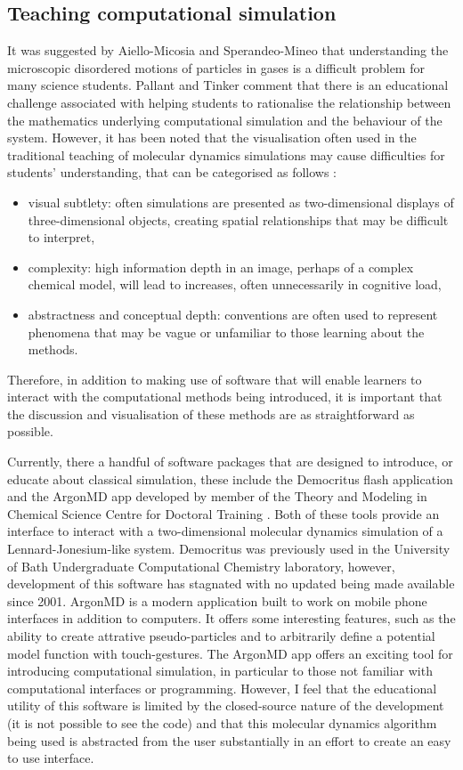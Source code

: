 \subsection{Teaching computational simulation}
It was suggested by Aiello-Micosia and Sperandeo-Mineo \cite{aiello-nicosia_computer_1985} that understanding the microscopic disordered motions of particles in gases is a difficult problem for many science students.
Pallant and Tinker \cite{pallant_reasoning_2004} comment that there is an educational challenge associated with helping students to rationalise the relationship between the mathematics underlying computational simulation and the behaviour of the system.
However, it has been noted that the visualisation often used in the traditional teaching of molecular dynamics simulations may cause difficulties for students' understanding, that can be categorised as follows \cite{jones_molecular_2005}:
\begin{itemize}
\item visual subtlety: often simulations are presented as two-dimensional displays of three-dimensional objects, creating spatial relationships that may be difficult to interpret,
\item complexity: high information depth in an image, perhaps of a complex chemical model, will lead to increases, often unnecessarily in cognitive load,
\item abstractness and conceptual depth: conventions are often used to represent phenomena that may be vague or unfamiliar to those learning about the methods.
\end{itemize}
Therefore, in addition to making use of software that will enable learners to interact with the computational methods being introduced, it is important that the discussion and visualisation of these methods are as straightforward as possible.

Currently, there a handful of software packages that are designed to introduce, or educate about classical simulation, these include the Democritus flash application and the ArgonMD app developed by member of the Theory and Modeling in Chemical Science Centre for Doctoral Training \cite{noauthor_democritus_nodate,noauthor_argonmd_nodate}.
Both of these tools provide an interface to interact with a two-dimensional molecular dynamics simulation of a Lennard-Jonesium-like system.
Democritus was previously used in the University of Bath Undergraduate Computational Chemistry laboratory, however, development of this software has stagnated with no updated being made available since 2001.
ArgonMD is a modern application built to work on mobile phone interfaces in addition to computers.
It offers some interesting features, such as the ability to create attrative pseudo-particles and to arbitrarily define a potential model function with touch-gestures.
The ArgonMD app offers an exciting tool for introducing computational simulation, in particular to those not familiar with computational interfaces or programming.
However, I feel that the educational utility of this software is limited by the closed-source nature of the development (it is not possible to see the code) and that this molecular dynamics algorithm being used is abstracted from the user substantially in an effort to create an easy to use interface.

